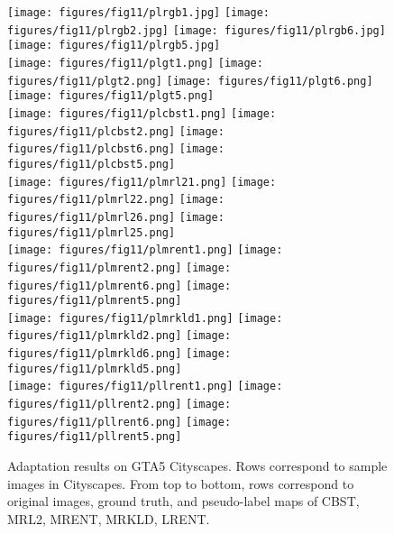 \documentclass[10pt,twocolumn,letterpaper]{article}
\theoremstyle{plain}
\begin{document}
\begin{figure*}[!t]
	\vspace{1mm}
	\texttt{[image: figures/fig11/plrgb1.jpg]}
	\texttt{[image: figures/fig11/plrgb2.jpg]}
	\texttt{[image: figures/fig11/plrgb6.jpg]}
	\texttt{[image: figures/fig11/plrgb5.jpg]}
	\quad\\\vspace{0.5mm}
	\texttt{[image: figures/fig11/plgt1.png]}
	\texttt{[image: figures/fig11/plgt2.png]}
	\texttt{[image: figures/fig11/plgt6.png]}
	\texttt{[image: figures/fig11/plgt5.png]}
	\quad\\\vspace{0.5mm}
	\texttt{[image: figures/fig11/plcbst1.png]}
	\texttt{[image: figures/fig11/plcbst2.png]}
	\texttt{[image: figures/fig11/plcbst6.png]}
	\texttt{[image: figures/fig11/plcbst5.png]}
	\quad\\\vspace{0.5mm}
	\texttt{[image: figures/fig11/plmrl21.png]}
	\texttt{[image: figures/fig11/plmrl22.png]}
	\texttt{[image: figures/fig11/plmrl26.png]}
	\texttt{[image: figures/fig11/plmrl25.png]}
	\quad\\\vspace{0.5mm}
	\texttt{[image: figures/fig11/plmrent1.png]}
	\texttt{[image: figures/fig11/plmrent2.png]}
	\texttt{[image: figures/fig11/plmrent6.png]}
	\texttt{[image: figures/fig11/plmrent5.png]}
	\quad\\\vspace{0.5mm}
	\texttt{[image: figures/fig11/plmrkld1.png]}
	\texttt{[image: figures/fig11/plmrkld2.png]}
	\texttt{[image: figures/fig11/plmrkld6.png]}
	\texttt{[image: figures/fig11/plmrkld5.png]}
	\quad\\\vspace{0.5mm}
	\texttt{[image: figures/fig11/pllrent1.png]}
	\texttt{[image: figures/fig11/pllrent2.png]}
	\texttt{[image: figures/fig11/pllrent6.png]}
	\texttt{[image: figures/fig11/pllrent5.png]}
	\caption{Adaptation results on GTA5  Cityscapes. Rows correspond to sample images in Cityscapes. From top to bottom, rows correspond to original images, ground truth, and pseudo-label maps of CBST, MRL2, MRENT, MRKLD, LRENT.}
	\label{fig:plgta2city}
\end{figure*}
\end{document}
